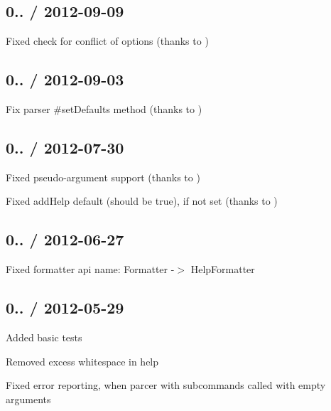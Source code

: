 \subsection*{0.. / 2012-\/09-\/09 }


\begin{DoxyItemize}
\item Fixed check for conflict of options (thanks to )
\end{DoxyItemize}

\subsection*{0.. / 2012-\/09-\/03 }


\begin{DoxyItemize}
\item Fix parser \#set\+Defaults method (thanks to )
\end{DoxyItemize}

\subsection*{0.. / 2012-\/07-\/30 }


\begin{DoxyItemize}
\item Fixed pseudo-\/argument support (thanks to )
\item Fixed add\+Help default (should be true), if not set (thanks to )
\end{DoxyItemize}

\subsection*{0.. / 2012-\/06-\/27 }


\begin{DoxyItemize}
\item Fixed formatter api name\+: Formatter -\/$>$ Help\+Formatter
\end{DoxyItemize}

\subsection*{0.. / 2012-\/05-\/29 }


\begin{DoxyItemize}
\item Added basic tests
\item Removed excess whitespace in help
\item Fixed error reporting, when parcer with subcommands called with empty arguments
\end{DoxyItemize}

